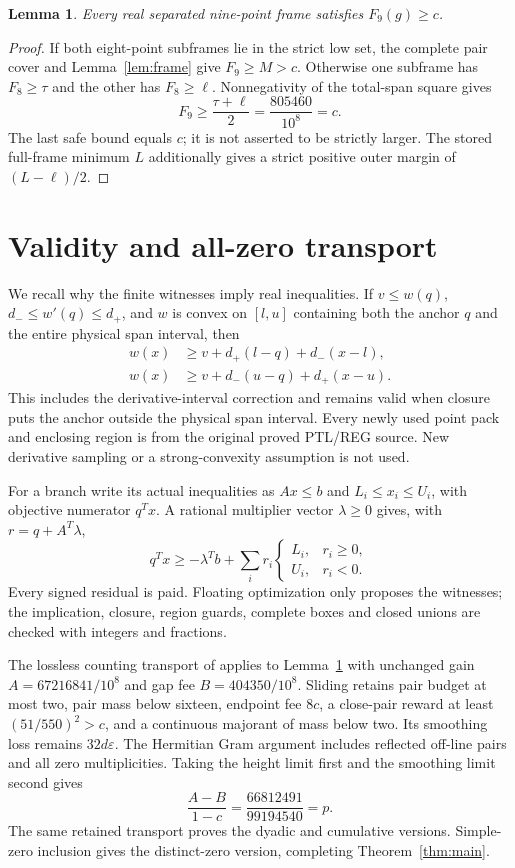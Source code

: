 \documentclass[11pt]{article}
\newtheorem{lemma}[theorem]{Lemma}
\begin{document}
\begin{lemma}\label{lem:nine}
Every real separated nine-point frame satisfies $F_9(g)\ge c$.
\end{lemma}
\begin{proof}
If both eight-point subframes lie in the strict low set, the
complete pair cover and Lemma~\ref{lem:frame} give $F_9\ge M>c$.
Otherwise one subframe has $F_8\ge\tau$ and the other has
$F_8\ge\ell$. Nonnegativity of the total-span square gives
\[
 F_9\ge\frac{\tau+\ell}{2}
       =\frac{805460}{10^8}=c.
\]
The last safe bound equals $c$; it is not asserted to be strictly
larger. The stored full-frame minimum $L$ additionally gives a
strict positive outer margin of $(L-\ell)/2$.
\end{proof}

\section{Validity and all-zero transport}
We recall why the finite witnesses imply real inequalities.
If $v\le w(q)$, $d_-\le w'(q)\le d_+$, and $w$ is convex on
$[l,u]$ containing both the anchor $q$ and the entire physical
span interval, then
\begin{align*}
 w(x)&\ge v+d_+(l-q)+d_-(x-l),\\
 w(x)&\ge v+d_-(u-q)+d_+(x-u).
\end{align*}
This includes the derivative-interval correction and remains valid
when closure puts the anchor outside the physical span interval.
Every newly used point pack and enclosing region is from the
original proved PTL/REG source. New derivative sampling or a
strong-convexity assumption is not used.

For a branch write its actual inequalities as $Ax\le b$ and
$L_i\le x_i\le U_i$, with objective numerator $q^Tx$. A rational
multiplier vector $\lambda\ge0$ gives, with $r=q+A^T\lambda$,
\[
 q^Tx\ge-\lambda^Tb+
 \sum_i r_i\begin{cases}L_i,&r_i\ge0,\\U_i,&r_i<0.\end{cases}
\]
Every signed residual is paid. Floating optimization only proposes
the witnesses; the implication, closure, region guards, complete
boxes and closed unions are checked with integers and fractions.

The lossless counting transport of \cite{Lossless,Ninth} applies
to Lemma~\ref{lem:nine} with unchanged gain $A=67216841/10^8$
and gap fee $B=404350/10^8$. Sliding retains pair budget at most
two, pair mass below sixteen, endpoint fee $8c$, a close-pair
reward at least $(51/550)^2>c$, and a continuous majorant of mass below
two. Its smoothing loss remains $32d\varepsilon$. The Hermitian
Gram argument includes reflected off-line pairs and all zero
multiplicities. Taking the height limit first and the smoothing
limit second gives
\[
 \frac{A-B}{1-c}=\frac{66812491}{99194540}=p.
\]
The same retained transport proves the dyadic and cumulative
versions. Simple-zero inclusion gives the distinct-zero version,
completing Theorem~\ref{thm:main}.
\end{document}
